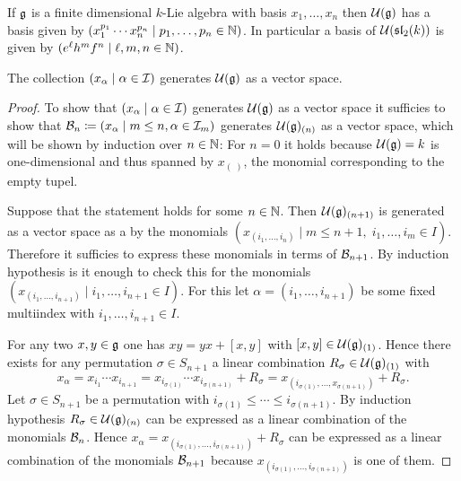 \begin{expl}
 If $\mathfrak{g}$ is a finite dimensional $k$-Lie algebra with basis $x_1, \dotsc, x_n$ then $\mathcal{U}(\mathfrak{g})$ has a basis given by $(x_1^{p_1} \dotsm x_n^{p_n} \mid p_1, \dotsc, p_n \in \mathbb{N})$. In particular a basis of $\mathcal{U}(\mathfrak{sl}_2(k))$ is given by $(e^\ell h^m f^n \mid \ell, m ,n \in \mathbb{N})$.
\end{expl}


\begin{lem}\label{lem: pbw concrete generating part}
 The collection $(x_\alpha \mid \alpha \in \mathcal{I})$ generates $\mathcal{U}(\mathfrak{g})$ as a vector space.
\end{lem}
\begin{proof}
 To show that $(x_\alpha \mid \alpha \in \mathcal{I})$ generates $\mathcal{U}(\mathfrak{g})$ as a vector space it sufficies to show that $\mathcal{B}_n \coloneqq (x_\alpha \mid m \leq n, \alpha \in \mathcal{I}_m)$ generates $\mathcal{U}(\mathfrak{g})_{(n)}$ as a vector space, which will be shown by induction over $n \in \mathbb{N}$: For $n = 0$ it holds because $\mathcal{U}(\mathfrak{g}) = k$ is one-dimensional and thus spanned by $x_{(\;)}$, the monomial corresponding to the empty tupel.
 
 Suppose that the statement holds for some $n \in \mathbb{N}$. Then $\mathcal{U}(\mathfrak{g})_{(n+1)}$ is generated as a vector space as a by the monomials $(x_{(i_1, \dotsc, i_n)} \mid m \leq n+1, \; i_1, \dotsc, i_m \in I)$. Therefore it sufficies to express these monomials in terms of $\mathcal{B}_{n+1}$. By induction hypothesis is it enough to check this for the monomials $(x_{(i_1, \dotsc, i_{n+1})} \mid i_1, \dotsc, i_{n+1} \in I)$. For this let $\alpha = (i_1, \dotsc, i_{n+1})$ be some fixed multiindex with $i_1, \dotsc, i_{n+1} \in I$.
 
 For any two $x,y \in \mathfrak{g}$ one has $xy = yx + [x,y]$ with $[x,y] \in \mathcal{U}(\mathfrak{g})_{(1)}$. Hence there exists for any permutation $\sigma \in S_{n+1}$ a linear combination $R_\sigma \in \mathcal{U}(\mathfrak{g})_{(1)}$ with
 \[
  x_\alpha
  = x_{i_1} \dotsm x_{i_{n+1}}
  = x_{i_{\sigma(1)}} \dotsm x_{i_{\sigma(n+1)}} + R_\sigma
  = x_{(i_{\sigma(1)}, \dotsc, x_{\sigma(n+1)})} + R_\sigma.
 \]
 Let $\sigma \in S_{n+1}$ be a permutation with $i_{\sigma(1)} \leq \dotsb \leq i_{\sigma(n+1)}$. By induction hypothesis $R_\sigma \in \mathcal{U}(\mathfrak{g})_{(n)}$ can be expressed as a linear combination of the monomials $\mathcal{B}_n$. Hence $x_\alpha = x_{(i_{\sigma(1)}, \dotsc, i_{\sigma(n+1)})} + R_\sigma$ can be expressed as a linear combination of the monomials $\mathcal{B}_{n+1}$ because $x_{(i_{\sigma(1)}, \dotsc, i_{\sigma(n+1)})}$ is one of them.
\end{proof}


